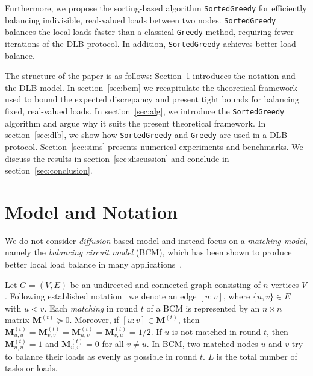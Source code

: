 \documentclass[12pt,psfig,a4]{article}
\newcommand{\sg}{\texttt{SortedGreedy}}
\newcommand{\gr}{\texttt{Greedy}}
\theoremstyle{plain}
\begin{document}
Furthermore, we propose the sorting-based algorithm \sg{} for efficiently balancing indivisible, real-valued loads between two nodes. \sg{} balances the local loads faster than a classical \gr{} method, requiring fewer iterations of the DLB protocol. In addition, \sg{} achieves better load balance.

The structure of the paper is as follows: Section~\ref{sec:matching} introduces the notation and the DLB model. In section~\ref{sec:bcm} we recapitulate the theoretical framework used to bound the expected discrepancy and present tight bounds for balancing fixed, real-valued loads. In section~\ref{sec:alg}, we introduce the \sg{} algorithm and argue why it suits the present theoretical framework. In section~\ref{sec:dlb}, we show how \sg{} and \gr{} are used in a DLB protocol. Section~\ref{sec:sims} presents numerical experiments and benchmarks. We discuss the results in section~\ref{sec:discussion} and conclude in section~\ref{sec:conclusion}.

\section{Model and Notation}
\label{sec:matching}
We do not consider \textit{diffusion}-based model and instead focus on a \textit{matching model}, namely the \textit{balancing circuit model} (BCM), which has been shown to produce better local load balance in many applications~\cite{xu1995nearest}. 

Let $G=(V,E)$ be an undirected and connected graph consisting of $n$ vertices $V$. Following established notation~\cite{rabani1998local,sauerwald2012tight} we denote an edge $[u : v]$, where $\{u,v\}\in E$ with $u<v$.  Each \textit{matching} in round $t$ of a BCM is represented by an $n\times n$ matrix $\mathbf{M}^{(t)} \succeq 0$. Moreover, if $[u : v] \in \mathbf{M}^{(t)}$,  then $\mathbf{M}_{u,u}^{(t)}=\mathbf{M}_{v,v}^{(t)}=\mathbf{M}_{u,v}^{(t)}=\mathbf{M}_{v,u}^{(t)}=1/2$. If $u$ is not matched in round $t$, then $\mathbf{M}_{u,u}^{(t)}=1$ and $\mathbf{M}_{u,v}^{(t)}=0$ for all $v\neq u$. In BCM, two matched nodes $u$ and $v$ try to balance their loads as evenly as possible in round $t$. $L$ is the total number of tasks or loads.\\
\end{document}
